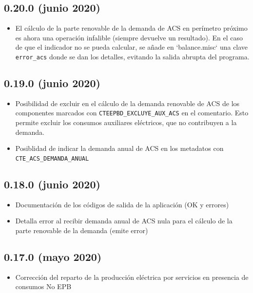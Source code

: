 \documentclass[10pt,notitlepage,oneside,a4paper]{article}
\begin{document}
\subsection{0.20.0 (junio 2020)}

\begin{itemize}
\item  El cálculo de la parte renovable de la demanda de ACS en perímetro próximo es ahora una operación infalible (siempre devuelve un resultado). En el caso de que el indicador no se pueda calcular, se añade en `balance.misc` una clave \texttt{error\_acs} donde se dan los detalles, evitando la salida abrupta del programa.
\end{itemize}

\subsection{0.19.0 (junio 2020)}

\begin{itemize}
\item  Posibilidad de excluir en el cálculo de la demanda renovable de ACS de los componentes marcados con \texttt{CTEEPBD\_EXCLUYE\_AUX\_ACS} en el comentario. Esto permite excluir los consumos auxiliares eléctricos, que no contribuyen a la demanda.
\item  Posiblidad de indicar la demanda anual de ACS en los metadatos con \texttt{CTE\_ACS\_DEMANDA\_ANUAL}
\end{itemize}

\subsection{0.18.0 (junio 2020)}

\begin{itemize}
\item  Documentación de los códigos de salida de la aplicación (OK y errores)
\end{itemize}

\begin{itemize}
\item  Detalla error al recibir demanda anual de ACS nula para el cálculo de la parte renovable de la demanda (emite error)
\end{itemize}

\subsection{0.17.0 (mayo 2020)}

\begin{itemize}
\item  Corrección del reparto de la producción eléctrica por servicios en presencia de consumos No EPB
\end{itemize}
\end{document}
